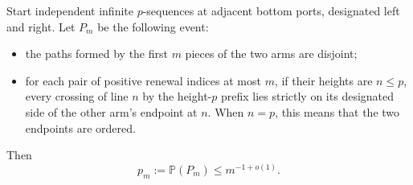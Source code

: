 \begin{lemma}\label{R:signed:two-arms}
Start independent infinite $p$-sequences at adjacent bottom ports,
designated left and right. Let $P_m$ be the following event:
\begin{itemize}
\item the paths formed by the first $m$ pieces of the two arms are disjoint;
\item for each pair of positive renewal indices at most $m$, if their
heights are $n\le p$, every crossing of line $n$ by the height-$p$ prefix
lies strictly on its designated side of the other arm's endpoint at $n$.
When $n=p$, this means that the two endpoints are ordered.
\end{itemize}
Then
\begin{equation}\label{R:alt:j:eq-br8}
 p_m:=\mathbb P(P_m)\le m^{-1+o(1)}.
\end{equation}
\end{lemma}
